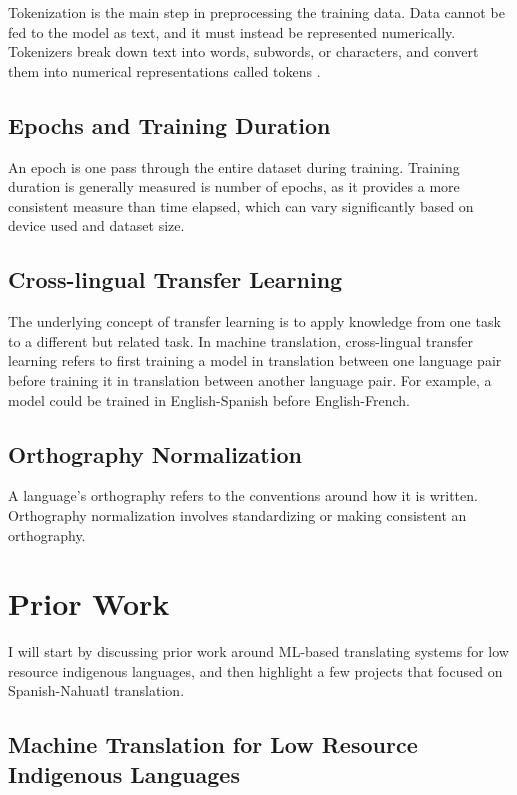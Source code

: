 \documentclass[10pt,twocolumn]{article}
\begin{document}
Tokenization is the main step in preprocessing the training data. Data cannot be fed to the model as text, and it must instead be represented numerically. Tokenizers break down text into words, subwords, or characters, and convert them into numerical representations called tokens \cite{Tokenizers}.  


\subsection{Epochs and Training Duration}

An epoch is one pass through the entire dataset during training. Training duration is generally measured is number of epochs, as it provides a more consistent measure than time elapsed, which can vary significantly based on device used and dataset size. \cite{Epoch}

\subsection{Cross-lingual Transfer Learning}
The underlying concept of transfer learning is to apply knowledge from one task to a different but related task. In machine translation, cross-lingual transfer learning refers to first training a model in translation between one language pair before training it in translation between another language pair. For example, a model could be trained in English-Spanish before English-French. \cite{Ren}

\subsection{Orthography Normalization}
A language's orthography refers to the conventions around how it is written. Orthography normalization involves standardizing or making consistent an orthography. \cite{Elotl}


\section{Prior Work}

I will start by discussing prior work around ML-based translating systems for low resource indigenous languages, and then highlight a few projects that focused on Spanish-Nahuatl translation.

\subsection{Machine Translation for Low Resource Indigenous Languages}
\end{document}

